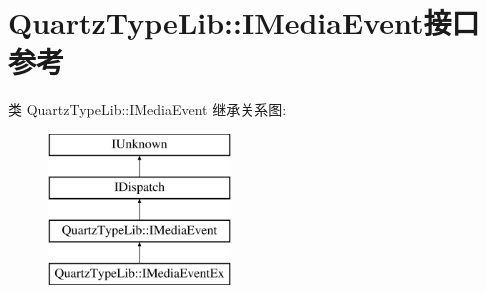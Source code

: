 \hypertarget{interface_quartz_type_lib_1_1_i_media_event}{}\section{Quartz\+Type\+Lib\+:\+:I\+Media\+Event接口 参考}
\label{interface_quartz_type_lib_1_1_i_media_event}
类 Quartz\+Type\+Lib\+:\+:I\+Media\+Event 继承关系图\+:\begin{figure}[H]
\begin{center}
\leavevmode
\includegraphics[height=4.000000cm]{interface_quartz_type_lib_1_1_i_media_event}
\end{center}
\end{figure}
